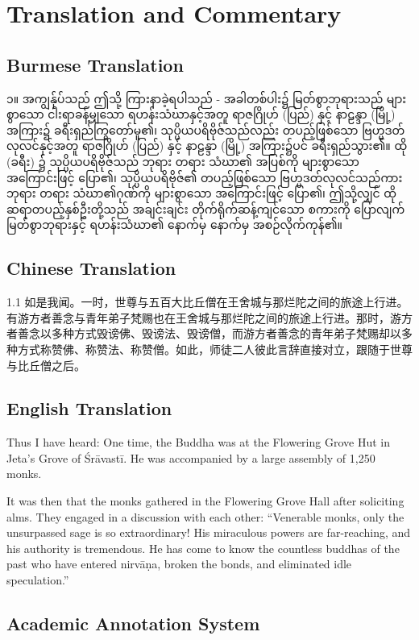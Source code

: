 \chapter{Translation and Commentary}
\starthere

\section{Burmese Translation}
၁။ အကျွန်ုပ်သည် ဤသို့ ကြားနာခဲ့ရပါသည် - အခါတစ်ပါး၌ မြတ်စွာဘုရားသည် များစွာသော ငါးရာခန့်မျှသော ရဟန်းသံဃာနှင့်အတူ ရာဇဂြိုဟ် (ပြည်) နှင့် နာဠန္ဒာ (မြို့) အကြား၌ ခရီးရှည်ကြွတော်မူ၏၊ သုပ္ပိယပရိဗိုဇ်သည်လည်း တပည့်ဖြစ်သော ဗြဟ္မဒတ်လုလင်နှင့်အတူ ရာဇဂြိုဟ် (ပြည်) နှင့် နာဠန္ဒာ (မြို့) အကြား၌ပင် ခရီးရှည်သွား၏။ ထို (ခရီး) ၌ သုပ္ပိယပရိဗိုဇ်သည် ဘုရား တရား သံဃာ၏ အပြစ်ကို များစွာသော အကြောင်းဖြင့် ပြော၏၊ သုပ္ပိယပရိဗိုဇ်၏ တပည့်ဖြစ်သော ဗြဟ္မဒတ်လုလင်သည်ကား ဘုရား တရား သံဃာ၏ဂုဏ်ကို များစွာသော အကြောင်းဖြင့် ပြော၏၊ ဤသို့လျှင် ထိုဆရာတပည့်နှစ်ဦးတို့သည် အချင်းချင်း တိုက်ရိုက်ဆန့်ကျင်သော စကားကို ပြောလျက် မြတ်စွာဘုရားနှင့် ရဟန်းသံဃာ၏ နောက်မှ နောက်မှ အစဉ်လိုက်ကုန်၏။

\section{Chinese Translation}
1.1 如是我闻。一时，世尊与五百大比丘僧在王舍城与那烂陀之间的旅途上行进。有游方者善念与青年弟子梵赐也在王舍城与那烂陀之间的旅途上行进。那时，游方者善念以多种方式毁谤佛、毁谤法、毁谤僧，而游方者善念的青年弟子梵赐却以多种方式称赞佛、称赞法、称赞僧。如此，师徒二人彼此言辞直接对立，跟随于世尊与比丘僧之后。

\section{English Translation}
Thus I have heard: One time, the Buddha was at the Flowering Grove Hut in Jeta’s Grove of Śrāvastī. He was accompanied by a large assembly of 1,250 monks.

It was then that the monks gathered in the Flowering Grove Hall after soliciting alms. They engaged in a discussion with each other: “Venerable monks, only the unsurpassed sage is so extraordinary! His miraculous powers are far-reaching, and his authority is tremendous. He has come to know the countless buddhas of the past who have entered nirvāṇa, broken the bonds, and eliminated idle speculation.”

\section{Academic Annotation System}

